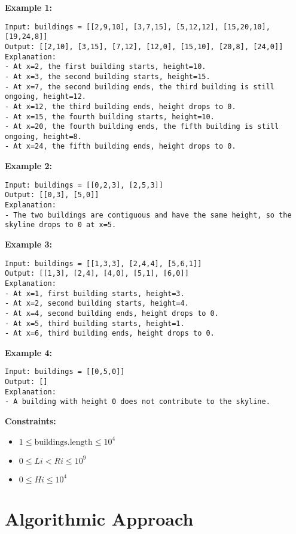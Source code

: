 \textbf{Example 1:}

\begin{verbatim}
Input: buildings = [[2,9,10], [3,7,15], [5,12,12], [15,20,10], [19,24,8]]
Output: [[2,10], [3,15], [7,12], [12,0], [15,10], [20,8], [24,0]]
Explanation:
- At x=2, the first building starts, height=10.
- At x=3, the second building starts, height=15.
- At x=7, the second building ends, the third building is still ongoing, height=12.
- At x=12, the third building ends, height drops to 0.
- At x=15, the fourth building starts, height=10.
- At x=20, the fourth building ends, the fifth building is still ongoing, height=8.
- At x=24, the fifth building ends, height drops to 0.
\end{verbatim}

\textbf{Example 2:}

\begin{verbatim}
Input: buildings = [[0,2,3], [2,5,3]]
Output: [[0,3], [5,0]]
Explanation:
- The two buildings are contiguous and have the same height, so the skyline drops to 0 at x=5.
\end{verbatim}

\textbf{Example 3:}

\begin{verbatim}
Input: buildings = [[1,3,3], [2,4,4], [5,6,1]]
Output: [[1,3], [2,4], [4,0], [5,1], [6,0]]
Explanation:
- At x=1, first building starts, height=3.
- At x=2, second building starts, height=4.
- At x=4, second building ends, height drops to 0.
- At x=5, third building starts, height=1.
- At x=6, third building ends, height drops to 0.
\end{verbatim}

\textbf{Example 4:}

\begin{verbatim}
Input: buildings = [[0,5,0]]
Output: []
Explanation:
- A building with height 0 does not contribute to the skyline.
\end{verbatim}

\textbf{Constraints:}

\begin{itemize}
    \item \(1 \leq \text{buildings.length} \leq 10^4\)
    \item \(0 \leq Li < Ri \leq 10^9\)
    \item \(0 \leq Hi \leq 10^4\)
\end{itemize}

\section*{Algorithmic Approach}

